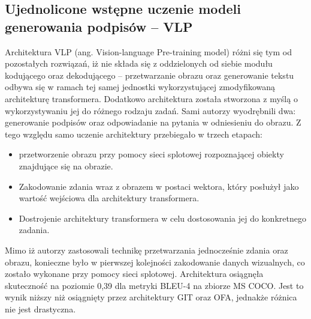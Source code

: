 \subsection{Ujednolicone wstępne uczenie modeli generowania podpisów -- VLP}
Architektura VLP \cite{vlp} (ang. Vision-language Pre-training model) różni się tym od pozostałych rozwiązań, iż nie składa się z oddzielonych od siebie modułu kodującego oraz dekodującego -- przetwarzanie obrazu oraz generowanie tekstu odbywa się w ramach tej samej jednostki wykorzystującej zmodyfikowaną architekturę transformera. Dodatkowo architektura została stworzona z myślą o wykorzystywaniu jej do różnego rodzaju zadań. Sami autorzy wyodrębnili dwa: generowanie podpisów oraz odpowiadanie na pytania w odniesieniu do obrazu. Z tego względu samo uczenie architektury przebiegało w trzech etapach:
\begin{itemize}
  \item przetworzenie obrazu przy pomocy sieci splotowej rozpoznającej obiekty znajdujące się na obrazie.
  \item Zakodowanie zdania wraz z obrazem w postaci wektora, który posłużył jako wartość wejściowa dla architektury transformera.
  \item Dostrojenie architektury transformera w celu dostosowania jej do konkretnego zadania.
\end{itemize}
Mimo iż autorzy zastosowali technikę przetwarzania jednocześnie zdania oraz obrazu, konieczne było w pierwszej kolejności zakodowanie danych wizualnych, co zostało wykonane przy pomocy sieci splotowej. Architektura osiągnęła skuteczność na poziomie 0,39 dla metryki BLEU-4 na zbiorze MS COCO. Jest to wynik niższy niż osiągnięty przez architektury GIT oraz OFA, jednakże różnica nie jest drastyczna.

